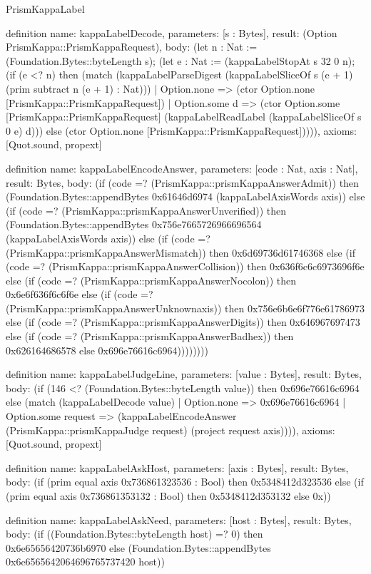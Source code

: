 \begin{lexlean}{PrismKappaLabel}
\begin{semanticmodule}
definition{
  name: kappaLabelDecode,
  parameters: [s : Bytes],
  result: (Option PrismKappa::PrismKappaRequest),
  body: (let n : Nat := (Foundation.Bytes::byteLength s); (let e : Nat := (kappaLabelStopAt s 32 0 n); (if (e <? n) then (match (kappaLabelParseDigest (kappaLabelSliceOf s (e + 1) (prim subtract n (e + 1) : Nat)))
    | Option.none => (ctor Option.none [PrismKappa::PrismKappaRequest])
    | Option.some d => (ctor Option.some [PrismKappa::PrismKappaRequest] (kappaLabelReadLabel (kappaLabelSliceOf s 0 e) d))) else (ctor Option.none [PrismKappa::PrismKappaRequest])))),
  axioms: [Quot.sound, propext]
}

definition{
  name: kappaLabelEncodeAnswer,
  parameters: [code : Nat, axis : Nat],
  result: Bytes,
  body: (if (code =? (PrismKappa::prismKappaAnswerAdmit)) then (Foundation.Bytes::appendBytes 0x61646d6974 (kappaLabelAxisWords axis)) else (if (code =? (PrismKappa::prismKappaAnswerUnverified)) then (Foundation.Bytes::appendBytes 0x756e7665726966696564 (kappaLabelAxisWords axis)) else (if (code =? (PrismKappa::prismKappaAnswerMismatch)) then 0x6d69736d61746368 else (if (code =? (PrismKappa::prismKappaAnswerCollision)) then 0x636f6c6c6973696f6e else (if (code =? (PrismKappa::prismKappaAnswerNocolon)) then 0x6e6f636f6c6f6e else (if (code =? (PrismKappa::prismKappaAnswerUnknownaxis)) then 0x756e6b6e6f776e61786973 else (if (code =? (PrismKappa::prismKappaAnswerDigits)) then 0x646967697473 else (if (code =? (PrismKappa::prismKappaAnswerBadhex)) then 0x626164686578 else 0x696e76616c6964))))))))
}

definition{
  name: kappaLabelJudgeLine,
  parameters: [value : Bytes],
  result: Bytes,
  body: (if (146 <? (Foundation.Bytes::byteLength value)) then 0x696e76616c6964 else (match (kappaLabelDecode value)
    | Option.none => 0x696e76616c6964
    | Option.some request => (kappaLabelEncodeAnswer (PrismKappa::prismKappaJudge request) (project request axis)))),
  axioms: [Quot.sound, propext]
}

definition{
  name: kappaLabelAskHost,
  parameters: [axis : Bytes],
  result: Bytes,
  body: (if (prim equal axis 0x736861323536 : Bool) then 0x5348412d323536 else (if (prim equal axis 0x736861353132 : Bool) then 0x5348412d353132 else 0x))
}

definition{
  name: kappaLabelAskNeed,
  parameters: [host : Bytes],
  result: Bytes,
  body: (if ((Foundation.Bytes::byteLength host) =? 0) then 0x6e65656420736b6970 else (Foundation.Bytes::appendBytes 0x6e6565642064696765737420 host))
}


\end{semanticmodule}
\end{lexlean}
